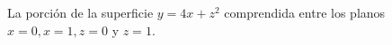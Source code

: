 \item La porción de la superficie $y = 4x + z^2$ comprendida entre los planos $x = 0, x = 1, z = 0$ y $z = 1$.
